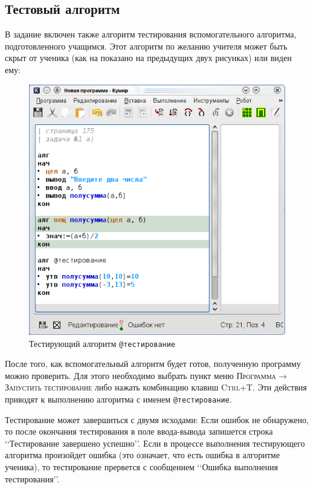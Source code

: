 \subsection{Тестовый алгоритм}

В задание включен также алгоритм тестирования вспомогательного алгоритма, подготовленного учащимся. Этот алгоритм  по желанию учителя может быть скрыт от ученика (как на показано на предыдущих двух рисунках) или виден ему:

\begin{figure}[htb]
\begin{center}
\includegraphics[scale=1]{ctrl_t_figure3.png}
\caption{Тестирующий алгоритм \texttt{@тестирование}}
\end{center}
\end{figure}

После того, как вспомогательный алгоритм будет готов, полученную программу можно проверить. Для этого необходимо выбрать пункт меню \textsc{Программа}$\rightarrow$\textsc{Запустить} 
\textsc{тестирование} либо нажать комбинацию клавиш \textsc{Ctrl+T}. 
Эти действия приводят к выполнению алгоритма с именем \texttt{@тестирование}.

Тестирование может завершиться с двумя исходами:
Если ошибок не обнаружено, то после окончания тестирования в поле ввода-вывода запишется строка \lq\lq Тестирование завершено успешно\rq\rq.
Если в процессе выполнения тестирующего алгоритма произойдет ошибка (это означает, что есть ошибка 
в алгоритме ученика), то тестирование прервется с сообщением \lq\lq Ошибка выполнения тестирования\rq\rq.


